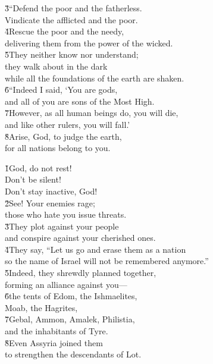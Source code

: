 \begin{poetry}
\poeml \v{3}``Defend the poor and the fatherless. \\
\poemll    Vindicate the afflicted and the poor. \\
\poeml \v{4}Rescue the poor and the needy, \\
\poemll    delivering them from the power of the wicked. \\
\poeml \v{5}They neither know nor understand; \\
\poemll    they walk about in the dark \\
\poemlll       while all the foundations of the earth are shaken. \\
\poeml \v{6}``Indeed I said, `You are gods, \\
\poemll    and all of you are sons of the Most High. \\
\poeml \v{7}However, as all human beings do, you will die, \\
\poemll    and like other rulers, you will fall.' \\
\poeml \v{8}Arise, God, to judge the earth, \\
\poemll    for all nations belong to you.
\end{poetry}

\begin{poetry}
\poeml \v{1}God, do not rest! \\
\poemll    Don't be silent! \\
\poemlll       Don't stay inactive, God! \\
\poeml \v{2}See! Your enemies rage; \\
\poemll    those who hate you issue threats. \\
\poeml \v{3}They plot against your people \\
\poemll    and conspire against your cherished ones. \\
\poeml \v{4}They say, ``Let us go and erase them as a nation \\
\poemll    so the name of Israel will not be remembered anymore.'' \\
\poeml \v{5}Indeed, they shrewdly planned together, \\
\poemll    forming an alliance against you--- \\
\poeml \v{6}the tents of Edom, the Ishmaelites, \\
\poemll    Moab, the Hagrites, \\
\poeml \v{7}Gebal, Ammon, Amalek, Philistia, \\
\poemll    and the inhabitants of Tyre. \\
\poeml \v{8}Even Assyria joined them \\
\poemll    to strengthen the descendants of Lot.
\end{poetry}

